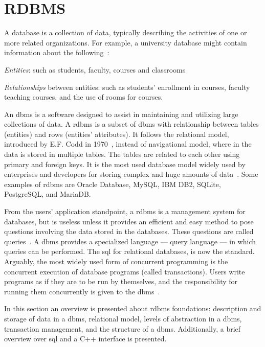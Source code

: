 %
\section{RDBMS}
\label{sec:rdbms}
A database is a collection of data, typically describing the activities of one
or more related organizations. For example, a university database might contain
information about the following~\cite{ramakrishnan2003database}:
\begin{item-c}
\item \emph{Entities}: such as students, faculty, courses and classrooms
\item \emph{Relationships} between entities: such as students' enrollment in
  courses, faculty teaching courses, and the use of rooms for courses.
\end{item-c}

An \acrfull{dbms} is a software designed to assist in maintaining and utilizing
large collections of data.
A \acrfull{rdbms} is a subset of \gls{dbms} with relationship between tables (entities)
and rows (entities' attributes). It follows the relational model, introduced by E.F. Codd in 1970~\cite{ramakrishnan2003database},
instead of navigational model, where in the data is stored in multiple tables.
The tables are related to each other
using primary and foreign keys. It is the most used database model widely used
by enterprises and developers for storing complex and huge amounts of
data~\cite{ramakrishnan2003database}. Some examples of \gls{rdbms} are Oracle Database,
MySQL, IBM DB2, SQLite, PostgreSQL, and MariaDB.

From the users' application standpoint, a \gls{rdbms} is a management system
for databases, but is useless unless it provides an efficient and easy method to
pose questions involving the data stored in the databases. These questions are
called queries~\cite{ramakrishnan2003database}.
A \gls{dbms} provides a
specialized language --- query language --- in which queries can be performed.
The \gls{sql} for relational databases, is now the standard.
Arguably, the most widely used form
of concurrent programming is the concurrent execution of database programs
(called transactions). Users write programs as if they are to be run by
themselves, and the responsibility for running them concurrently is given to the
\gls{dbms}~\cite{ramakrishnan2003database}.

In this section an overview is presented about \gls{rdbms} foundations:
description and storage of data in a \gls{dbms}, relational model, levels of abstraction in a \gls{dbms}, transaction management,
and the structure of a \gls{dbms}. Additionally, a brief overview over \gls{sql}
and a C++ interface is presented.

